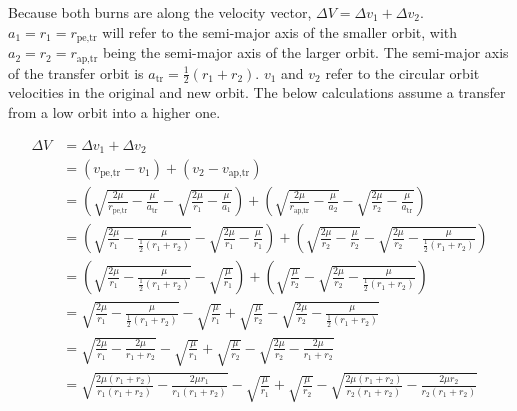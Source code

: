 \documentclass[../main.tex]{subfiles}
\begin{document}
Because both burns are along the velocity vector, $\Delta V=\Delta v_1+\Delta v_2$. $a_1=r_1=r_\text{pe,tr}$ will refer to the semi-major axis of the smaller orbit, with $a_2=r_2=r_\text{ap,tr}$ being the semi-major axis of the larger orbit. The semi-major axis of the transfer orbit is $a_\text{tr}=\frac{1}{2}(r_1+r_2)$. $v_1$ and $v_2$ refer to the circular orbit velocities in the original and new orbit. The below calculations assume a transfer from a low orbit into a higher one.

\begin{align*}
    \Delta V & = \Delta v_1+\Delta v_2                                                                                                                                                                                                           \\
             & = (v_\text{pe,tr}-v_1)+(v_2-v_\text{ap,tr})                                                                                                                                                                                       \\
             & = \left(\sqrt{\frac{2\mu}{r_\text{pe,tr}}-\frac{\mu}{a_\text{tr}}}-\sqrt{\frac{2\mu}{r_1}-\frac{\mu}{a_1}}\right)+\left(\sqrt{\frac{2\mu}{r_\text{ap,tr}}-\frac{\mu}{a_2}}-\sqrt{\frac{2\mu}{r_2}-\frac{\mu}{a_\text{tr}}}\right) \\
             & = \left(\sqrt{\frac{2\mu}{r_1}-\frac{\mu}{\frac{1}{2}(r_1+r_2)}}-\sqrt{\frac{2\mu}{r_1}-\frac{\mu}{r_1}}\right)+\left(\sqrt{\frac{2\mu}{r_2}-\frac{\mu}{r_2}}-\sqrt{\frac{2\mu}{r_2}-\frac{\mu}{\frac{1}{2}(r_1+r_2)}}\right)     \\
             & = \left(\sqrt{\frac{2\mu}{r_1}-\frac{\mu}{\frac{1}{2}(r_1+r_2)}}-\sqrt{\frac{\mu}{r_1}}\right)+\left(\sqrt{\frac{\mu}{r_2}}-\sqrt{\frac{2\mu}{r_2}-\frac{\mu}{\frac{1}{2}(r_1+r_2)}}\right)                                       \\
             & = \sqrt{\frac{2\mu}{r_1}-\frac{\mu}{\frac{1}{2}(r_1+r_2)}}-\sqrt{\frac{\mu}{r_1}}+\sqrt{\frac{\mu}{r_2}}-\sqrt{\frac{2\mu}{r_2}-\frac{\mu}{\frac{1}{2}(r_1+r_2)}}                                                                 \\
             & = \sqrt{\frac{2\mu}{r_1}-\frac{2\mu}{r_1+r_2}}-\sqrt{\frac{\mu}{r_1}}+\sqrt{\frac{\mu}{r_2}}-\sqrt{\frac{2\mu}{r_2}-\frac{2\mu}{r_1+r_2}}                                                                                         \\
             & = \sqrt{\frac{2\mu(r_1+r_2)}{r_1(r_1+r_2)}-\frac{2\mu{}r_1}{r_1(r_1+r_2)}}-\sqrt{\frac{\mu}{r_1}}+\sqrt{\frac{\mu}{r_2}}-\sqrt{\frac{2\mu(r_1+r_2)}{r_2(r_1+r_2)}-\frac{2\mu{}r_2}{r_2(r_1+r_2)}}                                 \\

\end{align*}
\end{document}
